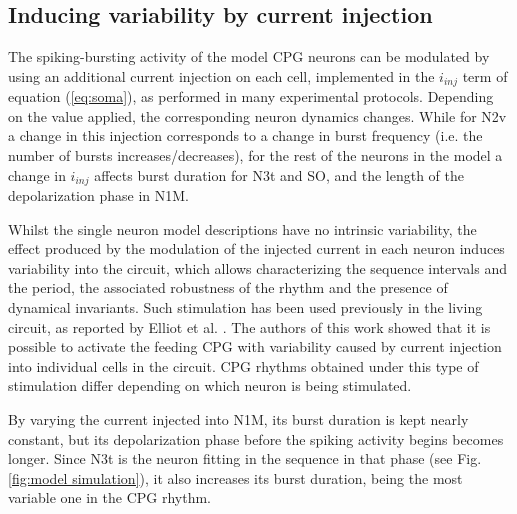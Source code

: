\subsection{Inducing variability by current injection}
\label{subsec:inj protocol}
The spiking-bursting activity of the model CPG neurons can be modulated by using an additional current injection on each cell, implemented in the \(i_{inj}\) term of equation (\ref{eq:soma}), as performed in many experimental protocols. Depending on the value %
applied,%
the corresponding neuron dynamics changes. While for N2v a change in this injection corresponds to a change in burst frequency (i.e. the number of bursts increases/decreases),
for the rest of the neurons in the model a change in \(i_{inj}\) affects burst duration for N3t and SO,  and the length of the depolarization phase in N1M.


Whilst the single neuron model descriptions have no intrinsic variability, the effect produced by the modulation of the injected current in each neuron induces variability into the circuit, which allows characterizing the sequence intervals and the period, the associated robustness of the rhythm and the presence of dynamical invariants. Such stimulation has been used previously in the living circuit, as reported by Elliot et al. \cite{Elliott1991}. The authors of this work showed that it is possible to activate the feeding CPG with variability caused by current injection into individual cells in the circuit. CPG rhythms obtained under this type of stimulation differ depending on which neuron is being stimulated. 


By varying the current injected into N1M, its burst duration is kept nearly constant, but its depolarization phase before the spiking activity begins becomes longer. Since N3t is the neuron fitting in the sequence in that phase (see Fig. \ref{fig:model simulation}), it also increases its burst duration, being the most variable one in the CPG rhythm. 

